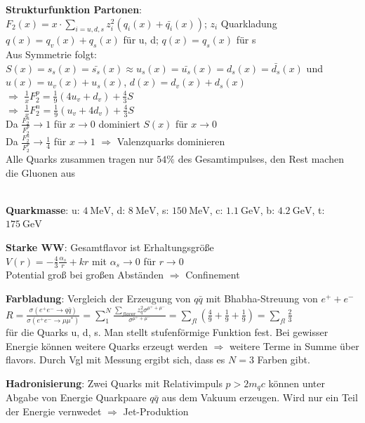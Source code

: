 \documentclass[10pt,twoside,a4paper]{article}
\begin{document}
\begin{multicols*}{3}
\textbf{Strukturfunktion Partonen}: \\
$F_2(x) = x \cdot \sum_{i=u,d,s} z^2_i (q_i(x) + \bar{q_i}(x))$; $z_i$ Quarkladung \\
$q(x) = q_v(x) + q_s(x)$ für u, d; $q(x) = q_s(x)$ für s \\
Aus Symmetrie folgt: $S(x) = s_s(x) = \bar{s_s}(x) \approx u_s(x) = \bar{u_s}(x) = d_s(x) = \bar{d_s}(x)$ und \\
$u(x) = u_v(x) + u_s(x)$, $d(x) = d_v(x) + d_s(x)$ \\
$\Rightarrow$ $\frac{1}{x} F^p_2 = \frac{1}{9} (4 u_v + d_v) + \frac{4}{3} S$ \\
$\Rightarrow$ $\frac{1}{x} F^n_2 = \frac{1}{9} (u_v + 4 d_v) + \frac{4}{3} S$ \\
Da $\frac{F^n_2}{F^p_2} \to 1$ für $x \to 0$ dominiert $S(x)$ für $x \to 0$ \\
Da $\frac{F^n_2}{F^p_2} \to \frac{1}{4}$ für $x \to 1$ $\Rightarrow$ Valenzquarks dominieren \\
Alle Quarks zusammen tragen nur $54\%$ des Gesamtimpulses, den Rest machen die Gluonen aus

\ \\
\textbf{Quarkmasse}: u: $\SI{4}{\mega\eV}$, d: $\SI{8}{\mega\eV}$, s: $\SI{150}{\mega\eV}$, c: $\SI{1.1}{\giga\eV}$, b: $\SI{4.2}{\giga\eV}$, t: $\SI{175}{\giga\eV}$

\textbf{Starke WW}: Gesamtflavor ist Erhaltungsgröße \\
$V(r) = - \frac{4}{3} \frac{\alpha_s}{r} + k r$ mit $\alpha_s \to 0$ für $r \to 0$ \\
Potential groß bei großen Abständen $\Rightarrow$ Confinement

\textbf{Farbladung}: Vergleich der Erzeugung von $q\bar{q}$ mit Bhabha-Streuung von $e^+ + e^-$ \\
$R = \frac{\sigma \left( e^+ e^- \to q \bar{q} \right)}{\sigma \left( e^+ e^- \to \mu \mu^* \right)} = \sum_1^N \frac{\sum_{flavor} z^2_q \sigma^{\mu^+ + \mu^-}}{\sigma^{\mu^+ + \mu^-}} = \sum_{fl} \left( \frac{4}{9} + \frac{1}{9} + \frac{1}{9} \right) = \sum_{fl} \frac{2}{3}$ \\
für die Quarks u, d, s. Man stellt stufenförmige Funktion fest. Bei gewisser Energie können weitere Quarks erzeugt werden $\Rightarrow$ weitere Terme in Summe über flavors. Durch Vgl mit Messung ergibt sich, dass es $N=3$ Farben gibt.

\textbf{Hadronisierung}: Zwei Quarks mit Relativimpuls $p > 2 m_q c$ können unter Abgabe von Energie Quarkpaare $q\bar{q}$ aus dem Vakuum erzeugen. Wird nur ein Teil der Energie vernwedet $\Rightarrow$ Jet-Produktion 


\end{multicols*}
\end{document}
